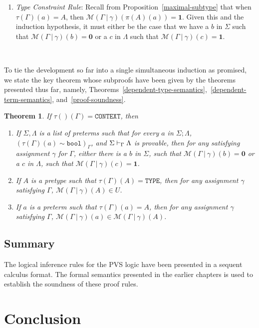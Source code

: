 \documentclass [12pt,twoside]{cslreport}
\newcommand{\thmbox}
   {{\ \hfill\hbox{%
      \vrule width1.0ex height1.0ex
   }\parfillskip 0pt }}
\newenvironment{proof}{{\bf Proof. }}{\thmbox}
\newcommand{\tauGamma}[1]{\tau(\Gamma)(#1)}
\newcommand{\Mgamma}[1]{{\mathcal M}(\Gamma\vbar\gamma)(#1)}
\newcommand{\oneb}{\mathbf{1}}
\newcommand{\zerob}{\mathbf{0}}
\newcommand{\ttbool}{\mathtt{bool}}
\newcommand{\tttype}{\mathtt{TYPE}}
\newcommand{\ttcontext}{\mathtt{CONTEXT}}
\newcommand{\vbar}{\ |\ }
\newtheorem{theorem}{Theorem}
\begin{document}
\begin{proof}
\begin{enumerate}
\begin{description}
\end{description}

\item \emph{Type Constraint Rule}: Recall from
Proposition~\ref{maximal-subtype}
that when $\tauGamma{a} = A$, then
$\Mgamma{\pi(A)(a)} = \oneb$.  Given this and the induction hypothesis,
it must either be the case that we have a $b$ in $\Sigma$ such that
$\Mgamma{b} = \zerob$ or a $c$ in $\Lambda$ such that $\Mgamma{c} =
\oneb$\@. 
\end{enumerate}
\end{proof}

To tie the development so far into a single simultaneous
induction as promised, we state the key theorem whose subproofs have been
given by the theorems presented thus far, namely,
Theorems~\ref{dependent-type-semantics},~\ref{dependent-term-semantics},
and~\ref{proof-soundness}\@.  
\begin{theorem}\label{big-soundness}
If $\tau()(\Gamma) = \ttcontext$, then 
\begin{enumerate}
\item If $\Sigma, \Lambda$ is a list of preterms such that for every $a$
in $\Sigma; \Lambda$, $(\tauGamma{a} \sim 
\ttbool)_\Gamma$, and $\Sigma\vdash_{\Gamma}\Lambda$ is provable, then
for any satisfying assignment
$\gamma$ for $\Gamma$, 
either there is a $b$ in $\Sigma$, such that $\Mgamma{b} = \zerob$ or a $c$ in
$\Lambda$, such that $\Mgamma{c} = \oneb$\@.

\item If $A$ is a pretype such that $\tauGamma{A} = \tttype$, then for any
assignment $\gamma$ 
satisfying $\Gamma$, $\Mgamma{A}\in U$\@.

\item If $a$ is a preterm such that $\tauGamma{a} = A$, then for any
assignment $\gamma$ satisfying $\Gamma$, $\Mgamma{a}\in \Mgamma{A}$\@.
\end{enumerate}
\end{theorem}


\section{Summary}

The logical inference rules for the PVS logic have been presented in a
sequent calculus format.  The formal semantics presented in the earlier
chapters is used to establish the soundness of these proof rules.


\chapter{Conclusion}\label{conclusion}
\end{document}
